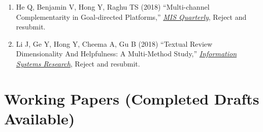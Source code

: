 \documentclass[paper=letter,fontsize=10pt]{scrartcl} %
\newcommand{\NewPart}[2]{\section*{{#1} #2}}
\newcommand{\ReviewEntry}[5]{
		\noindent #1 (#2) ``#3,'' \textit{\ul{#4}}, #5.}
\newcommand{\Hong}{Hong Y}
\begin{document}
\begin{enumerate}
\item \ReviewEntry{He Q, Benjamin V, \Hong, Raghu TS}{2018}{Multi-channel Complementarity in Goal-directed Platforms}{\protect\newline MIS Quarterly}{Reject and resubmit}{}


\item \ReviewEntry{Li J, Ge Y, \Hong, Cheema A, Gu B}{2018}{Textual Review Dimensionality And Helpfulness: A Multi-Method Study}{\protect\newline Information Systems Research}{Reject and resubmit}{}

\end{enumerate}



\NewPart{Working Papers}{\small\textmd{(Completed Drafts Available)}} %
\end{document}
